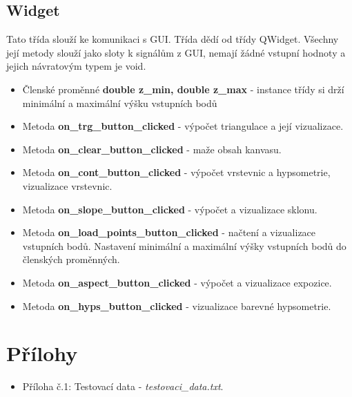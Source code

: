 \documentclass[a4paper, 12pt]{article}
\begin{document}
\clearpage


\subsection{Widget}
Tato třída slouží ke komunikaci s GUI. Třída dědí od třídy QWidget. Všechny její metody slouží jako sloty k signálům z GUI, nemají žádné vstupní hodnoty a jejich návratovým typem je void. 

\begin{itemize}
	
	\item Členské proměnné \textbf{double z\_min, double z\_max} - instance třídy si drží minimální a maximální výšku vstupních bodů

	\item Metoda \textbf{on\_trg\_button\_clicked} - výpočet triangulace a její vizualizace.

	\item Metoda \textbf{on\_clear\_button\_clicked} - maže obsah kanvasu.
	
	\item Metoda \textbf{on\_cont\_button\_clicked} - výpočet vrstevnic a hypsometrie, vizualizace vrstevnic.

	\item Metoda \textbf{on\_slope\_button\_clicked} - výpočet a vizualizace sklonu. 

	\item Metoda \textbf{on\_load\_points\_button\_clicked} - načtení a vizualizace vstupních bodů. Nastavení minimální a maximální výšky vstupních bodů do členských proměnných.
	
	\item Metoda \textbf{on\_aspect\_button\_clicked} - výpočet a vizualizace expozice.
	
	\item Metoda \textbf{on\_hyps\_button\_clicked} - vizualizace barevné hypsometrie.

\end{itemize} 


\clearpage

\section{Přílohy}

\begin{itemize}
	\item Příloha č.1: Testovací data - \textit{testovaci\_data.txt}.
\end{itemize}
\clearpage
\end{document}
